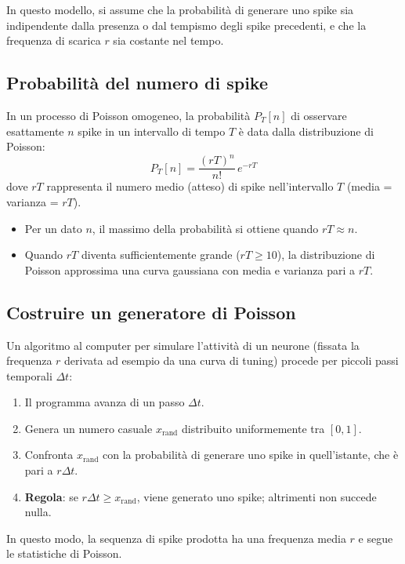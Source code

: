 In questo modello, si assume che la probabilità di generare uno spike sia indipendente dalla presenza o dal tempismo degli spike precedenti, e che la frequenza di scarica $r$ sia costante nel tempo.

\subsection{Probabilità del numero di spike}
In un processo di Poisson omogeneo, la probabilità $P_T[n]$ di osservare esattamente $n$ spike in un intervallo di tempo $T$ è data dalla distribuzione di Poisson:
\begin{equation}
P_T[n] = \frac{(rT)^n}{n!}\, e^{-rT}
\label{eq:poisson_n}
\end{equation}
dove $rT$ rappresenta il numero medio (atteso) di spike nell'intervallo $T$ (media = varianza = $rT$).

\begin{itemize}
    \item Per un dato $n$, il massimo della probabilità si ottiene quando $rT \approx n$.
    \item Quando $rT$ diventa sufficientemente grande ($rT \ge 10$), la distribuzione di Poisson approssima una curva gaussiana con media e varianza pari a $rT$.
\end{itemize}

\subsection{Costruire un generatore di Poisson}
Un algoritmo al computer per simulare l'attività di un neurone (fissata la frequenza $r$ derivata ad esempio da una curva di tuning) procede per piccoli passi temporali $\Delta t$:
\begin{enumerate}
    \item Il programma avanza di un passo $\Delta t$.
    \item Genera un numero casuale $x_{\text{rand}}$ distribuito uniformemente tra $[0, 1]$.
    \item Confronta $x_{\text{rand}}$ con la probabilità di generare uno spike in quell'istante, che è pari a $r\Delta t$.
    \item \textbf{Regola}: se $r\Delta t \ge x_{\text{rand}}$, viene generato uno spike; altrimenti non succede nulla.
\end{enumerate}
In questo modo, la sequenza di spike prodotta ha una frequenza media $r$ e segue le statistiche di Poisson.

